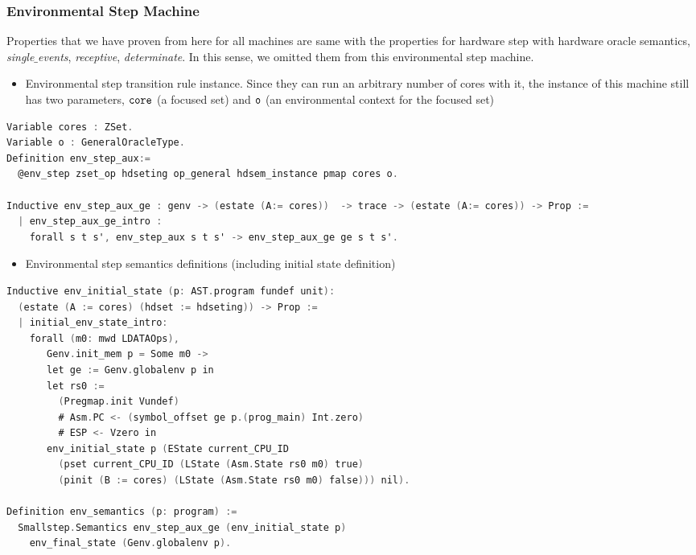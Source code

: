 \subsubsection{Environmental Step Machine}

Properties that we have proven from here for all machines are same with the properties for  hardware step with hardware oracle semantics,
\textit{single$\_$events}, \textit{receptive}, \textit{determinate}. 
In this sense, we omitted them from this environmental step machine.

\begin{itemize}[leftmargin=*]
\item Environmental step transition rule instance. Since they can run an arbitrary number of cores with it, 
the instance of this machine still has two parameters, ${\mathrm{\texttt{core}}}$ (a focused set) and ${\mathrm{\texttt{o}}}$ (an environmental context for 
the focused set)
\end{itemize}
\begin{lstlisting}[language=C]
Variable cores : ZSet.
Variable o : GeneralOracleType.
Definition env_step_aux:=
  @env_step zset_op hdseting op_general hdsem_instance pmap cores o.

Inductive env_step_aux_ge : genv -> (estate (A:= cores))  -> trace -> (estate (A:= cores)) -> Prop :=
  | env_step_aux_ge_intro : 
    forall s t s', env_step_aux s t s' -> env_step_aux_ge ge s t s'.
\end{lstlisting}

\begin{itemize}[leftmargin=*]
\item Environmental step  semantics definitions (including initial state definition)
\end{itemize}
\begin{lstlisting}[language=C]
Inductive env_initial_state (p: AST.program fundef unit): 
  (estate (A := cores) (hdset := hdseting)) -> Prop :=
  | initial_env_state_intro: 
    forall (m0: mwd LDATAOps),
       Genv.init_mem p = Some m0 ->
       let ge := Genv.globalenv p in
       let rs0 :=
         (Pregmap.init Vundef)
         # Asm.PC <- (symbol_offset ge p.(prog_main) Int.zero)
         # ESP <- Vzero in
       env_initial_state p (EState current_CPU_ID 
         (pset current_CPU_ID (LState (Asm.State rs0 m0) true)
         (pinit (B := cores) (LState (Asm.State rs0 m0) false))) nil).

Definition env_semantics (p: program) :=
  Smallstep.Semantics env_step_aux_ge (env_initial_state p) 
    env_final_state (Genv.globalenv p).    
\end{lstlisting}

